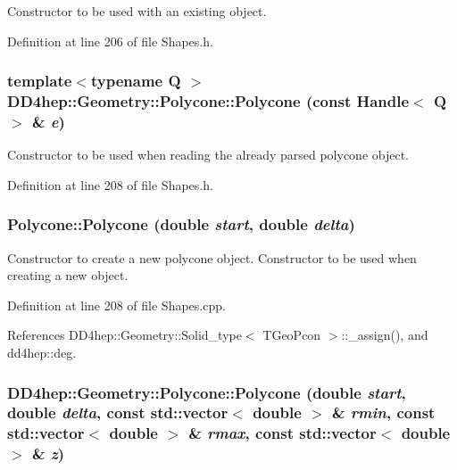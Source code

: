 Constructor to be used with an existing object. 

Definition at line 206 of file Shapes.h.\hypertarget{class_d_d4hep_1_1_geometry_1_1_polycone_abbf81a5ca5e5b3a41d565d3ac2ce3950}{
\subsubsection[{Polycone}]{\setlength{\rightskip}{0pt plus 5cm}template$<$typename Q $>$ DD4hep::Geometry::Polycone::Polycone (const {\bf Handle}$<$ Q $>$ \& {\em e})}}
\label{class_d_d4hep_1_1_geometry_1_1_polycone_abbf81a5ca5e5b3a41d565d3ac2ce3950}


Constructor to be used when reading the already parsed polycone object. 

Definition at line 208 of file Shapes.h.\hypertarget{class_d_d4hep_1_1_geometry_1_1_polycone_aee9015113e47313a9b382ed7ce0ec63b}{
\subsubsection[{Polycone}]{\setlength{\rightskip}{0pt plus 5cm}Polycone::Polycone (double {\em start}, \/  double {\em delta})}}
\label{class_d_d4hep_1_1_geometry_1_1_polycone_aee9015113e47313a9b382ed7ce0ec63b}


Constructor to create a new polycone object. Constructor to be used when creating a new object. 

Definition at line 208 of file Shapes.cpp.

References DD4hep::Geometry::Solid\_\-type$<$ TGeoPcon $>$::\_\-assign(), and dd4hep::deg.\hypertarget{class_d_d4hep_1_1_geometry_1_1_polycone_a111234e6083a005c756d58526852d67c}{
\subsubsection[{Polycone}]{\setlength{\rightskip}{0pt plus 5cm}DD4hep::Geometry::Polycone::Polycone (double {\em start}, \/  double {\em delta}, \/  const std::vector$<$ double $>$ \& {\em rmin}, \/  const std::vector$<$ double $>$ \& {\em rmax}, \/  const std::vector$<$ double $>$ \& {\em z})}}
\label{class_d_d4hep_1_1_geometry_1_1_polycone_a111234e6083a005c756d58526852d67c}



